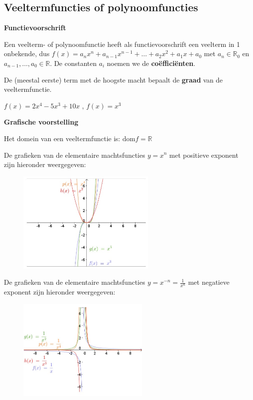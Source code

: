 \subsection{Veeltermfuncties of polynoomfuncties}
\label{sec:vtf}

\textbf{Functievoorschrift}

\begin{definitie}
	Een veelterm- of polynoomfunctie heeft als functievoorschrift een veelterm in 1 onbekende, dus
$f(x)=a_{n}x^{n}+a_{n-1}x^{n-1}+\ldots+a_{2}x^{2}+a_{1}x+a_{0}$
met $a_{n}\in\mathbb{R}_{0}$ en $a_{n-1},\ldots,a_{0}\in\mathbb{R}$. De constanten $a_{i}$ noemen we de \textbf{co\"effici\"enten}.

\end{definitie}

De (meestal eerste) term met de hoogste macht bepaalt de \textbf{graad} van de veeltermfunctie.

\begin{voorbeeld}
	$f(x)=2x^{4}-5x^{3}+10x$ , $f(x)=x^{3}$ 
\end{voorbeeld}

\textbf{Grafische voorstelling}

Het domein van een veeltermfunctie is: $\textrm{dom}f=\mathbb{R}$

De grafieken van de elementaire machtsfuncties $y=x^{n}$
met positieve exponent zijn hieronder weergegeven:

\begin{figure}[h]
\centering{}\includegraphics[height=5cm]{2_elem_rekenvaardigheden_B/inputs/veeltermfuncties1.jpg} 
\end{figure}


De grafieken van de elementaire machtsfuncties $y=x^{-n}=\frac{1}{x^{n}}$
met negatieve exponent zijn hieronder weergegeven:

\begin{figure}[h]
\centering{}\includegraphics[height=5cm]{2_elem_rekenvaardigheden_B/inputs/veeltermfuncties2.jpg} 
\end{figure}


